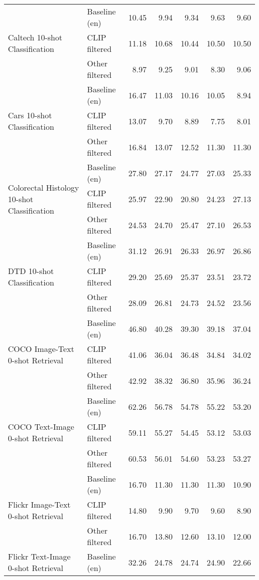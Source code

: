 {\begin{longtable}{l|l|rrrrr}
\midrule
\multirow[t]{3}{*}{Caltech 10-shot Classification} & Baseline (en) & 10.45 & 9.94 & 9.34 & 9.63 & 9.60 \\
 & CLIP filtered & 11.18 & 10.68 & 10.44 & 10.50 & 10.50 \\
 & Other filtered & 8.97 & 9.25 & 9.01 & 8.30 & 9.06 \\
\midrule
\multirow[t]{3}{*}{Cars 10-shot Classification} & Baseline (en) & 16.47 & 11.03 & 10.16 & 10.05 & 8.94 \\
 & CLIP filtered & 13.07 & 9.70 & 8.89 & 7.75 & 8.01 \\
 & Other filtered & 16.84 & 13.07 & 12.52 & 11.30 & 11.30 \\
\midrule
\multirow[t]{3}{*}{Colorectal Histology 10-shot Classification} & Baseline (en) & 27.80 & 27.17 & 24.77 & 27.03 & 25.33 \\
 & CLIP filtered & 25.97 & 22.90 & 20.80 & 24.23 & 27.13 \\
 & Other filtered & 24.53 & 24.70 & 25.47 & 27.10 & 26.53 \\
\midrule
\multirow[t]{3}{*}{DTD 10-shot Classification} & Baseline (en) & 31.12 & 26.91 & 26.33 & 26.97 & 26.86 \\
 & CLIP filtered & 29.20 & 25.69 & 25.37 & 23.51 & 23.72 \\
 & Other filtered & 28.09 & 26.81 & 24.73 & 24.52 & 23.56 \\
\midrule
\multirow[t]{3}{*}{COCO Image-Text 0-shot Retrieval} & Baseline (en) & 46.80 & 40.28 & 39.30 & 39.18 & 37.04 \\
 & CLIP filtered & 41.06 & 36.04 & 36.48 & 34.84 & 34.02 \\
 & Other filtered & 42.92 & 38.32 & 36.80 & 35.96 & 36.24 \\
\midrule
\multirow[t]{3}{*}{COCO Text-Image 0-shot Retrieval} & Baseline (en) & 62.26 & 56.78 & 54.78 & 55.22 & 53.20 \\
 & CLIP filtered & 59.11 & 55.27 & 54.45 & 53.12 & 53.03 \\
 & Other filtered & 60.53 & 56.01 & 54.60 & 53.23 & 53.27 \\
\midrule
\multirow[t]{3}{*}{Flickr Image-Text 0-shot Retrieval} & Baseline (en) & 16.70 & 11.30 & 11.30 & 11.30 & 10.90 \\
 & CLIP filtered & 14.80 & 9.90 & 9.70 & 9.60 & 8.90 \\
 & Other filtered & 16.70 & 13.80 & 12.60 & 13.10 & 12.00 \\
\midrule
\multirow[t]{3}{*}{Flickr Text-Image 0-shot Retrieval} & Baseline (en) & 32.26 & 24.78 & 24.74 & 24.90 & 22.66 \\

\end{longtable}}
